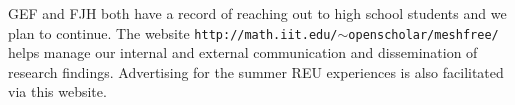\documentclass[11pt]{NSFamsart}
\begin{document}
\begin{description}[leftmargin=2.5ex]
\item[Reaching Out]
GEF and FJH both have a record of reaching out to high school students and we plan to continue. The website {\tt http://math.iit.edu/$\sim$openscholar/meshfree/} helps manage our internal and external communication and dissemination of research findings. Advertising for the summer REU experiences is also facilitated via this website.


\end{description}


\newpage
\clearpage
{}



\renewcommand{\refname}{\hfill \textbf{\large References Cited} \hfill \hfill}                   %
\renewcommand{\bibliofont}{\normalsize}


\end{document}
